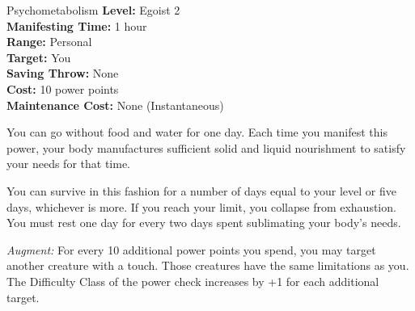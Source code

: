 {Psychometabolism}
{
	\textbf{Level:}
	Egoist 2\\
	\textbf{Manifesting Time:}
	1 hour\\
	\textbf{Range:}
	Personal\\
	\textbf{Target:}
	You\\
	\textbf{Saving Throw:}
	None\\
	\textbf{Cost:}
	10 power points\\
	\textbf{Maintenance Cost:}
	None (Instantaneous)\\
}
{
	You can go without food and water for one day. Each time you manifest this power, your body manufactures sufficient solid and liquid nourishment to satisfy your needs for that time.

	You can survive in this fashion for a number of days equal to your level or five days, whichever is more. If you reach your limit, you collapse from exhaustion. You must rest one day for every two days spent sublimating your body's needs.

	\textit{Augment:} For every 10 additional power points you spend, you may target another creature with a touch. Those creatures have the same limitations as you. The Difficulty Class of the power check increases by +1 for each additional target.
}